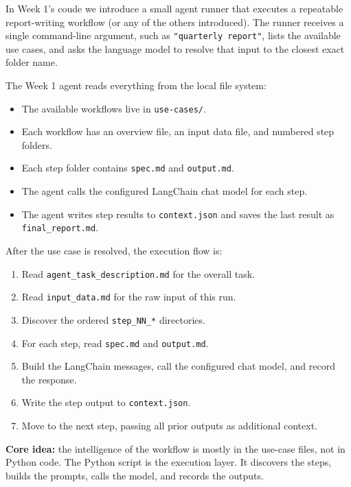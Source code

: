 \documentclass[12pt, a4paper]{article}
\begin{document}
In Week 1's coude we introduce a small agent runner that executes a repeatable report-writing workflow (or any of the others introduced). The runner receives a single command-line argument, such as \texttt{"quarterly report"}, lists the available use cases, and asks the language model to resolve that input to the closest exact folder name.

The Week 1 agent reads everything from the local file system:

\begin{itemize}[leftmargin=1.5em]
  \item The available workflows live in \texttt{use-cases/}.
  \item Each workflow has an overview file, an input data file, and numbered step folders.
  \item Each step folder contains \texttt{spec.md} and \texttt{output.md}.
  \item The agent calls the configured LangChain chat model for each step.
  \item The agent writes step results to \texttt{context.json} and saves the last result as \texttt{final\_report.md}.
\end{itemize}

After the use case is resolved, the execution flow is:

\begin{enumerate}[leftmargin=1.5em]
  \item Read \texttt{agent\_task\_description.md} for the overall task.
  \item Read \texttt{input\_data.md} for the raw input of this run.
  \item Discover the ordered \texttt{step\_NN\_*} directories.
  \item For each step, read \texttt{spec.md} and \texttt{output.md}.
  \item Build the LangChain messages, call the configured chat model, and record the response.
  \item Write the step output to \texttt{context.json}.
  \item Move to the next step, passing all prior outputs as additional context.
\end{enumerate}

\begin{notebox}
\textbf{Core idea:} the intelligence of the workflow is mostly in the use-case files, not in Python code. The Python script is the execution layer. It discovers the steps, builds the prompts, calls the model, and records the outputs.
\end{notebox}
\end{document}
